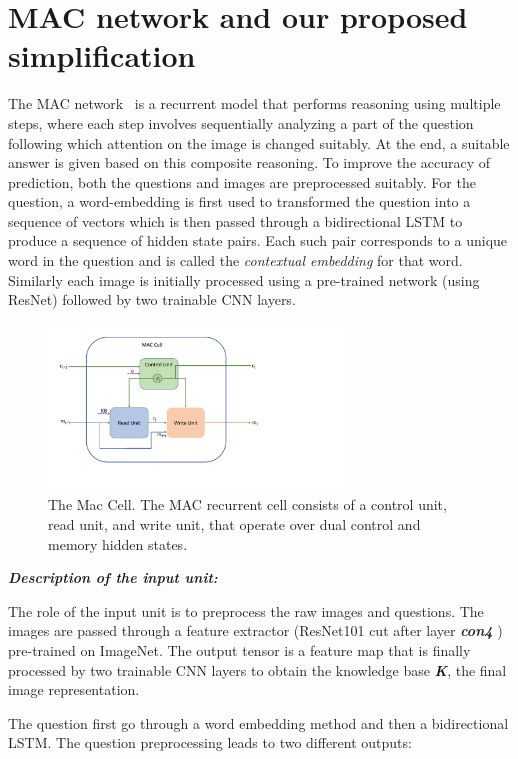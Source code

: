 \section{MAC network and our proposed simplification}

The MAC network~\cite{hudsonManning18} is a recurrent model that performs reasoning 
using multiple steps, where each step involves sequentially analyzing a part of the question following which attention on the image is changed suitably.
At the end, a suitable answer is given based on this composite reasoning.
To improve the accuracy of prediction, both the questions and images
are preprocessed suitably. For the question,  a word-embedding is first used to
transformed the question into a sequence of vectors which is then passed through
a bidirectional LSTM to produce a sequence of hidden state pairs. Each such pair 
corresponds to a unique word in the question and is called the 
\emph{contextual embedding} for that word.
Similarly each image is initially processed using a pre-trained network (using ResNet) followed by two trainable CNN layers. 

\begin{figure}[htbp]
	\centering
	\includegraphics[width=0.7\textwidth]{img/mac_cell.pdf}
	\caption{The Mac Cell. The MAC recurrent cell consists of a control unit, read unit, and write unit, that operate over dual control and memory hidden states. }
	\label{fig:mac_cell}
\end{figure}

\textbf{\textit{Description of the input unit:}}

The role of the input unit is to preprocess the raw images and questions. 
The images are passed through a feature extractor (ResNet101 cut after layer \textbf{\textit{con4}} ) pre-trained on ImageNet. The output tensor is a feature map that is finally processed by two trainable CNN layers to obtain the knowledge base \textbf{\textit{K}}, the final image representation.

The question first go through a word embedding method and then a bidirectional LSTM.
The question preprocessing leads to two different outputs:

